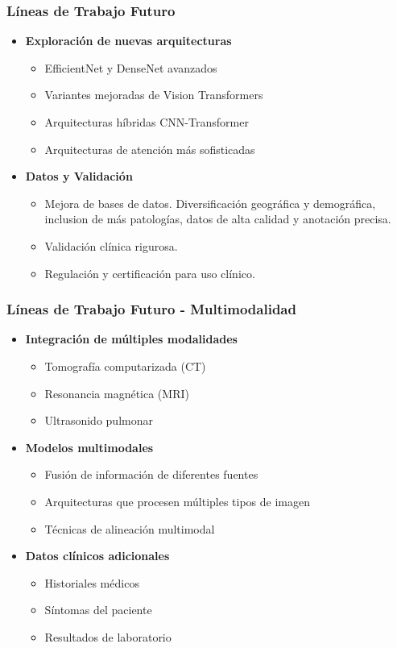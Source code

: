 \begin{frame}
\frametitle{Líneas de Trabajo Futuro}
\begin{itemize}
    \item \textbf{Exploración de nuevas arquitecturas}
    \begin{itemize}
        \item EfficientNet y DenseNet avanzados
        \item Variantes mejoradas de Vision Transformers
        \item Arquitecturas híbridas CNN-Transformer
        \item Arquitecturas de atención más sofisticadas
    \end{itemize}
    \item \textbf{Datos y Validación}
    \begin{itemize}
        \item Mejora de bases de datos. Diversificación geográfica y demográfica, inclusion de más patologías, datos de alta calidad y anotación precisa.
        \item Validación clínica rigurosa.
        \item Regulación y certificación para uso clínico.
    \end{itemize}
\end{itemize}
\end{frame}

\begin{frame}
\frametitle{Líneas de Trabajo Futuro - Multimodalidad}
\begin{itemize}
    \item \textbf{Integración de múltiples modalidades}
    \begin{itemize}
        \item Tomografía computarizada (CT)
        \item Resonancia magnética (MRI)
        \item Ultrasonido pulmonar
    \end{itemize}
    \item \textbf{Modelos multimodales}
    \begin{itemize}
        \item Fusión de información de diferentes fuentes
        \item Arquitecturas que procesen múltiples tipos de imagen
        \item Técnicas de alineación multimodal
    \end{itemize}
    \item \textbf{Datos clínicos adicionales}
    \begin{itemize}
        \item Historiales médicos
        \item Síntomas del paciente
        \item Resultados de laboratorio
    \end{itemize}
\end{itemize}
\end{frame}

